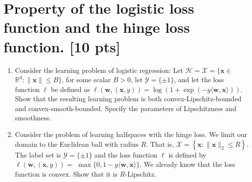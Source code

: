 \documentclass[12pt,letterpaper]{article}
\theoremstyle{definition}
\begin{document}
\begin{enumerate}[label=(\alph*)]
\begin{itemize}
\end{itemize}
\end{enumerate}



\section{Property of the logistic loss function and the hinge loss function. [10 pts]}
\vspace{-2ex}

\begin{enumerate}[label=(\alph*)]
\item  Consider the learning problem of logistic regression: Let $\mathcal{H}=\mathcal{X}=\{\bm{x} \in$ $\mathbb{R}^{d}:\|\bm{x}\| \leq B\}$, for some scalar $B>0$, let $\mathcal{Y}=\{\pm 1\}$, and let the loss function $\ell$ be defined as $\ell(\bm{w},(\bm{x}, y))=\log (1+\exp (-y\langle\bm{w}, \bm{x}\rangle))$. Show that the resulting learning problem is both convex-Lipschitz-bounded and convex-smooth-bounded. Specify the parameters of Lipschitzness and smoothness.

    \item Consider the problem of learning halfspaces with the hinge loss. We limit our domain to the Euclidean ball with radius $R$. That is, $\mathcal{X}=\left\{\bm{x}:\|\bm{x}\|_{2} \leq R\right\}$. The label set is $\mathcal{Y}=\{\pm 1\}$ and the loss function $\ell$ is defined by $\ell(\bm{w},(\bm{x}, y))=$ $\max \{0,1-y\langle\bm{w}, \bm{x}\rangle\}$. We already know that the loss function is convex. Show that it is $R$-Lipschitz.

\end{enumerate}
\end{document}
